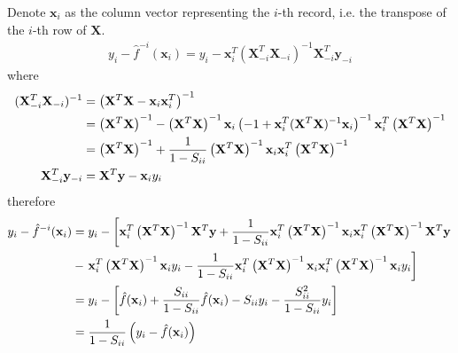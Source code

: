 \begin{exercise}
  \begin{exerciseSection}
    Denote $\mathbf{x}_i$ as the column vector representing the $i$-th record,
    i.e. the transpose of the $i$-th row of $\mathbf{X}$.
    \begin{align}
      y_i-\hat{f}^{-i}(\mathbf{x}_i) =
      y_i-\mathbf{x}_i^T(\mathbf{X}_{-i}^T\mathbf{X}_{-i})^{-1}
      \mathbf{X}_{-i}^T\mathbf{y}_{-i}
    \end{align}
    where
    \begin{subequations}
      \begin{align}
        (\mathbf{X}_{-i}^T\mathbf{X}_{-i})^{-1} &= \left(\mathbf{X}^T\mathbf{X} -
        \mathbf{x}_i\mathbf{x}_i^T \right)^{-1} \notag\\
        &= \left(\mathbf{X}^T\mathbf{X}\right)^{-1} - 
        \left(\mathbf{X}^T\mathbf{X}\right)^{-1} \mathbf{x}_i\left(-1 +
        \mathbf{x}_i^T(\mathbf{X}^T\mathbf{X})^{-1}\mathbf{x}_i\right)^{-1}\mathbf{x}_i^T
        \left(\mathbf{X}^T\mathbf{X}\right)^{-1} \notag\\
        &= \left(\mathbf{X}^T\mathbf{X}\right)^{-1} + \frac{1}{1-S_{ii}}
        \left(\mathbf{X}^T\mathbf{X}\right)^{-1} \mathbf{x}_i\mathbf{x}_i^T
        \left(\mathbf{X}^T\mathbf{X}\right)^{-1} \\
        \mathbf{X}_{-i}^T\mathbf{y}_{-i} &= \mathbf{X}^T\mathbf{y}
        -\mathbf{x}_iy_i
      \end{align}
    \end{subequations}
    therefore
    \begin{align}
      y_i-\hat{f}^{-i}(\mathbf{x}_i) &= y_i -
      \left[\mathbf{x}_i^T\left(\mathbf{X}^T\mathbf{X}\right)^{-1}\mathbf{X}^T\mathbf{y}
      + \frac{1}{1-S_{ii}} \mathbf{x}_i^T
      \left(\mathbf{X}^T\mathbf{X}\right)^{-1} \mathbf{x}_i\mathbf{x}_i^T
      \left(\mathbf{X}^T\mathbf{X}\right)^{-1} \mathbf{X}^T\mathbf{y}\right.
      \notag\\
      & -  
      \left. \mathbf{x}_i^T\left(\mathbf{X}^T\mathbf{X}\right)^{-1}
      \mathbf{x}_iy_i -
      \frac{1}{1-S_{ii}} \mathbf{x}_i^T \left(\mathbf{X}^T\mathbf{X}\right)^{-1}
      \mathbf{x}_i\mathbf{x}_i^T \left(\mathbf{X}^T\mathbf{X}\right)^{-1}
      \mathbf{x}_iy_i\right] \notag\\
      &= y_i - \left[\hat{f}(\mathbf{x}_i) +
      \frac{S_{ii}}{1-S_{ii}}\hat{f}(\mathbf{x}_i) - S_{ii}y_i -
      \frac{S_{ii}^2}{1-S_{ii}}y_i \right]\notag\\
      &= \frac{1}{1-S_{ii}}\left(y_i - \hat{f}(\mathbf{x}_i) \right)

\end{align}
\end{exerciseSection}
\end{exercise}
